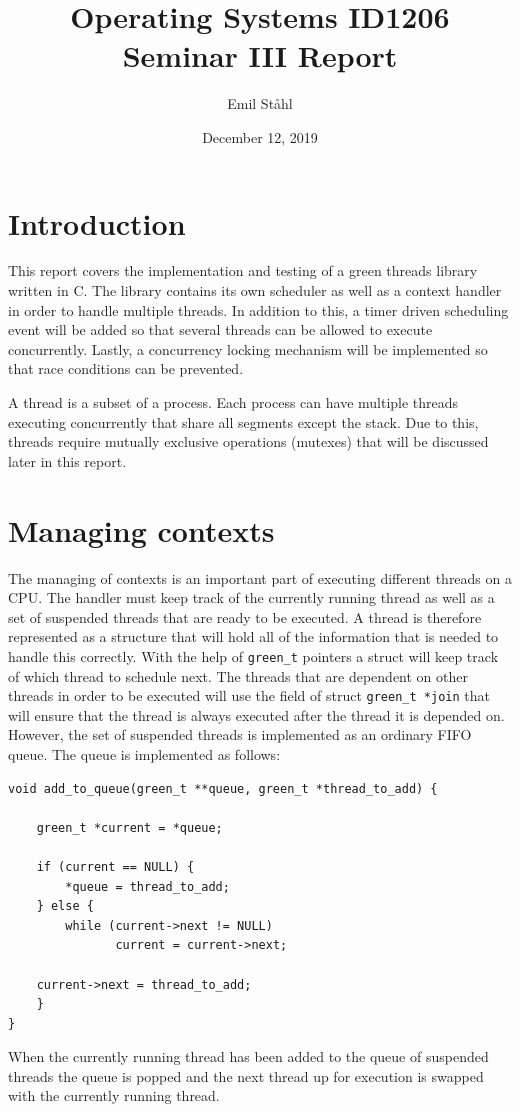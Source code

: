\documentclass{article}
\title{\textbf{Operating Systems ID1206} \\ 
\textbf{Seminar III Report}}
\author{Emil Ståhl}
\date{December 12, 2019}
\begin{document}
\maketitle

\section{Introduction}
This report covers the implementation and testing of a green threads library written in C. The library contains its own scheduler as well as a context handler in order to handle multiple threads. In addition to this, a timer driven scheduling event will be added so that several threads can be allowed to execute concurrently. Lastly, a concurrency locking mechanism will be implemented so that race conditions can be prevented.

A thread is a subset of a process. Each process can have multiple threads executing concurrently that share all segments except the stack. Due to this, threads require mutually exclusive operations (mutexes) that will be discussed later in this report. 

\section{Managing contexts}

The managing of contexts is an important part of executing different threads on a CPU. The handler must keep track of the currently running thread as well as a set of suspended threads that are ready to be executed. A thread is therefore represented as a structure that will hold all of the information that is needed to handle this correctly. With the help of \texttt{green\_t} pointers a struct will keep track of which thread to schedule next. The threads that are dependent on other threads in order to be executed will use the field of struct \texttt{green\_t *join} that will ensure that the thread is always executed after the thread it is depended on.
However, the set of suspended threads is implemented as an ordinary FIFO queue. The queue is implemented as follows:

\clearpage
\begin{verbatim}
void add_to_queue(green_t **queue, green_t *thread_to_add) {
    
    green_t *current = *queue;    
    
    if (current == NULL) {
        *queue = thread_to_add;
    } else {
        while (current->next != NULL)	
               current = current->next;

    current->next = thread_to_add;
    }
}
\end{verbatim}
When the currently running thread has been added to the queue of suspended threads the queue is popped and the next thread up for execution is swapped with the currently running thread. 
\end{document}
